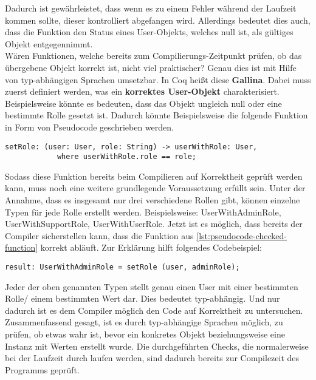 Dadurch ist gewährleistet, dass wenn es zu einem Fehler während der Laufzeit kommen sollte, dieser kontrolliert abgefangen wird. Allerdings bedeutet dies auch, dass die Funktion den Status eines User-Objekts, welches null ist, als gültiges Objekt entgegennimmt.\\
Wären Funktionen, welche bereits zum Compilierungs-Zeitpunkt prüfen, ob das übergebene Objekt korrekt ist, nicht viel praktischer? Genau dies ist mit Hilfe von typ-abhängigen Sprachen umsetzbar. In Coq heißt diese \textbf{Gallina}. Dabei muss zuerst definiert werden, was ein \textbf{korrektes User-Objekt} charakterisiert. Beispielsweise könnte es bedeuten, dass das Objekt ungleich null oder eine bestimmte Rolle gesetzt ist. Dadurch könnte Beispielsweise die folgende Funktion in Form von Pseudocode geschrieben werden.
\begin{lstlisting}[language=coq,firstnumber=1,caption=Pseudocode Check auf null des User Objektes,label=lst:pseudocode-checked-function]
setRole: (user: User, role: String) -> userWithRole: User,
			where userWithRole.role == role;
\end{lstlisting}
Sodass diese Funktion bereits beim Compilieren auf Korrektheit geprüft werden kann, muss noch eine weitere grundlegende Voraussetzung erfüllt sein.
Unter der Annahme, dass es insgesamt nur drei verschiedene Rollen gibt, können einzelne Typen für jede Rolle erstellt werden. Beispielsweise: UserWithAdminRole, UserWithSupportRole, UserWithUserRole. 
Jetzt ist es möglich, dass bereits der Compiler sicherstellen kann, dass die Funktion aus \ref{lst:pseudocode-checked-function} korrekt abläuft. Zur Erklärung hilft folgendes Codebeispiel:
\begin{lstlisting}[language=coq,firstnumber=1,caption=Pseudocode Check auf null des User Objektes,label=lst:pseudocode-checked-function-usage]
result: UserWithAdminRole = setRole (user, adminRole);
\end{lstlisting}
Jeder der oben genannten Typen stellt genau einen User mit einer bestimmten Rolle/ einem bestimmten Wert dar. Dies bedeutet typ-abhängig. Und nur dadurch ist es dem Compiler möglich den Code auf Korrektheit zu untersuchen.\cite{MARTIN01:FV}
Zusammenfassend gesagt, ist es durch typ-abhängige Sprachen möglich, zu prüfen, ob etwas wahr ist, bevor ein konkretes Objekt beziehungsweise eine Instanz mit Werten erstellt wurde. Die durchgeführten Checks, die normalerweise bei der Laufzeit durch laufen werden, sind dadurch bereits zur Compilezeit des Programms geprüft.\\
\\

